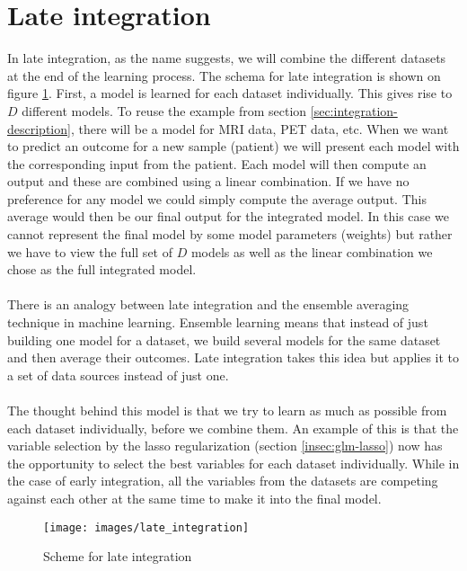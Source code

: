 \section{Late integration}
\label{sec:integration-late}
In late integration, as the name suggests, we will combine the different datasets at the end of the learning process. The schema for late integration is shown on figure \ref{fig:integration-late}. First, a model is learned for each dataset individually. This gives rise to $D$ different models. To reuse the example from section \ref{sec:integration-description}, there will be a model for MRI data, PET data, etc. When we want to predict an outcome for a new sample (patient) we will present each model with the corresponding input from the patient. Each model will then compute an output and these are combined using a linear combination. If we have no preference for any model we could simply compute the average output. This average would then be our final output for the integrated model. In this case we cannot represent the final model by some model parameters (weights) but rather we have to view the full set of $D$ models as well as the linear combination we chose as the full integrated model. \\ \\
There is an analogy between late integration and the ensemble averaging technique in machine learning. Ensemble learning \cite{dietterich2002ensemble}\cite{dietterich2000ensemble}\cite{wikiensemble} means that instead of just building one model for a dataset, we build several models for the same dataset and then average their outcomes. Late integration takes this idea but applies it to a set of data sources instead of just one. \\ \\
The thought behind this model is that we try to learn as much as possible from each dataset individually, before we combine them. An example of this is that the variable selection by the lasso regularization (section \ref{insec:glm-lasso}) now has the opportunity to select the best variables for each dataset individually. While in the case of early integration, all the variables from the datasets are competing against each other at the same time to make it into the final model.
\begin{figure}
	\centering
	\texttt{[image: images/late\_integration]}
	\caption{Scheme for late integration}
	\label{fig:integration-late}
\end{figure}
